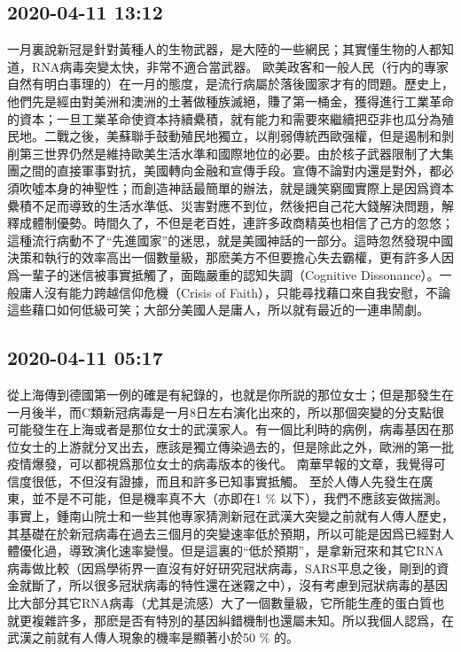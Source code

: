 \documentclass[twocolumn]{ctexart}
\begin{document}
\subsection*{2020-04-11 13:12}

一月裏說新冠是針對黃種人的生物武器，是大陸的一些網民；其實懂生物的人都知道，RNA病毒突變太快，非常不適合當武器。
歐美政客和一般人民（行内的專家自然有明白事理的）在一月的態度，是流行病屬於落後國家才有的問題。歷史上，他們先是經由對美洲和澳洲的土著做種族滅絕，賺了第一桶金，獲得進行工業革命的資本；一旦工業革命使資本持續纍積，就有能力和需要來繼續把亞非也瓜分為殖民地。二戰之後，美蘇聯手鼓動殖民地獨立，以削弱傳統西歐强權，但是遏制和剝削第三世界仍然是維持歐美生活水準和國際地位的必要。由於核子武器限制了大集團之間的直接軍事對抗，美國轉向金融和宣傳手段。宣傳不論對内還是對外，都必須吹噓本身的神聖性；而創造神話最簡單的辦法，就是譏笑窮國實際上是因爲資本纍積不足而導致的生活水準低、災害對應不到位，然後把自己花大錢解決問題，解釋成體制優勢。時間久了，不但是老百姓，連許多政商精英也相信了己方的忽悠；這種流行病動不了“先進國家”的迷思，就是美國神話的一部分。這時忽然發現中國決策和執行的效率高出一個數量級，那麽美方不但要擔心失去霸權，更有許多人因爲一輩子的迷信被事實抵觸了，面臨嚴重的認知失調（Cognitive Dissonance）。一般庸人沒有能力跨越信仰危機（Crisis of Faith），只能尋找藉口來自我安慰，不論這些藉口如何低級可笑；大部分美國人是庸人，所以就有最近的一連串鬧劇。
\subsection*{2020-04-11 05:17}

從上海傳到德國第一例的確是有紀錄的，也就是你所説的那位女士；但是那發生在一月後半，而C類新冠病毒是一月8日左右演化出來的，所以那個突變的分支點很可能發生在上海或者是那位女士的武漢家人。有一個比利時的病例，病毒基因在那位女士的上游就分叉出去，應該是獨立傳染過去的，但是除此之外，歐洲的第一批疫情爆發，可以都視爲那位女士的病毒版本的後代。
南華早報的文章，我覺得可信度很低，不但沒有證據，而且和許多已知事實抵觸。
至於人傳人先發生在廣東，並不是不可能，但是機率真不大（亦即在1 \% 以下），我們不應該妄做揣測。事實上，鍾南山院士和一些其他專家猜測新冠在武漢大突變之前就有人傳人歷史，其基礎在於新冠病毒在過去三個月的突變速率低於預期，所以可能是因爲已經對人體優化過，導致演化速率變慢。但是這裏的“低於預期”，是拿新冠來和其它RNA病毒做比較（因爲學術界一直沒有好好研究冠狀病毒，SARS平息之後，剛到的資金就斷了，所以很多冠狀病毒的特性還在迷霧之中），沒有考慮到冠狀病毒的基因比大部分其它RNA病毒（尤其是流感）大了一個數量級，它所能生產的蛋白質也就更複雜許多，那麽是否有特別的基因糾錯機制也還屬未知。所以我個人認爲，在武漢之前就有人傳人現象的機率是顯著小於50 \% 的。
\end{document}
